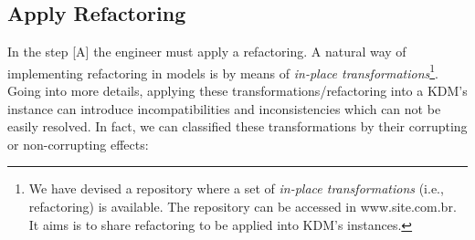 




\subsection{Apply Refactoring} %
\label{sub:apply_refactoring}

In the step [A] the engineer must apply a refactoring. A natural way of implementing refactoring in models is by means of \textit{in-place transformations}\footnote{We have devised a repository where a set of \textit{in-place transformations} (i.e., refactoring) is available. The repository can be accessed in www.site.com.br. It aims is to share refactoring to be applied into KDM's instances.}. %
Going into more details, applying these transformations/refactoring into a KDM's instance can introduce incompatibilities and inconsistencies which can not be easily resolved. In fact, we can classified these transformations by their corrupting or non-corrupting effects:%

